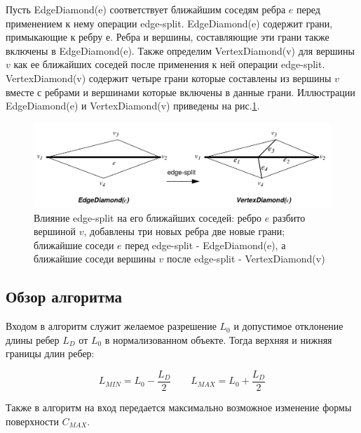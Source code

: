 \documentclass[14pt]{article}
\numberwithin{figure}{section}
\numberwithin{equation}{section}
\begin{document}
Пусть EdgeDiamond(e) соответствует ближайшим соседям ребра $e$ перед применением к нему операции edge-split. EdgeDiamond(e) содержит грани, примыкающие к ребру $е$. Ребра и вершины, составляющие эти грани также включены в EdgeDiamond(e). Также определим VertexDiamond(v) для вершины $v$ как ее ближайших соседей после применения к ней операции edge-split. VertexDiamond(v) содержит четыре грани которые составлены из вершины $v$ вместе с ребрами и вершинами которые включены в данные грани. Иллюстрации EdgeDiamond(e) и VertexDiamond(v) приведены на рис.\ref{ris:mc3}.

\begin{figure}
	\begin{center}
		\includegraphics[scale = 0.25]{mc3.JPG}
		\caption{Влияние edge-split на его ближайших соседей: ребро $e$ разбито вершиной $v$, добавлены три новых ребра две новые грани; ближайшие соседи $e$ перед edge-split - EdgeDiamond(e), а ближайшие соседи вершины $v$ после edge-split - VertexDiamond(v)}
		\label{ris:mc3}
	\end{center}
\end{figure}

\subsection{Обзор алгоритма}

Входом в алгоритм служит желаемое разрешение $L_0$ и допустимое отклонение длины ребер $L_D$ от $L_0$ в нормализованном объекте. Тогда верхняя и нижняя границы длин ребер:

\begin{equation}
	L_{MIN} = L_0 - \frac{L_D}{2} \qquad L_{MAX} = L_0 + \frac{L_D}{2}
\end{equation}

Также в алгоритм на вход передается максимально возможное изменение формы поверхности $C_{MAX}$.
\end{document}
